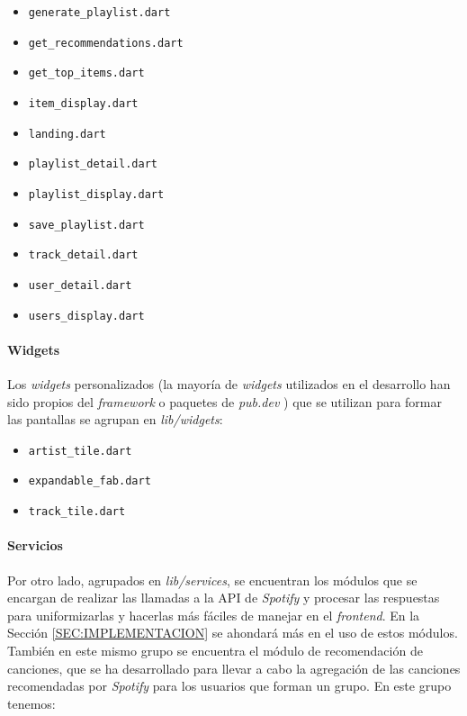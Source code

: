\begin{itemize}
  \item \texttt{generate\_playlist.dart}
  \item \texttt{get\_recommendations.dart}
  \item \texttt{get\_top\_items.dart}
  \item \texttt{item\_display.dart}
  \item \texttt{landing.dart}
  \item \texttt{playlist\_detail.dart}
  \item \texttt{playlist\_display.dart}
  \item \texttt{save\_playlist.dart}
  \item \texttt{track\_detail.dart}
  \item \texttt{user\_detail.dart}
  \item \texttt{users\_display.dart}
\end{itemize}


\paragraph{Widgets}

Los \textit{widgets} personalizados (la mayoría de \textit{widgets} utilizados en el desarrollo han sido propios del \textit{framework} o paquetes de \textit{pub.dev} \cite{pub_dev}) que 
se utilizan para formar las pantallas se agrupan en \textit{lib/widgets}:

\begin{itemize}
  \item \texttt{artist\_tile.dart}
  \item \texttt{expandable\_fab.dart}
  \item \texttt{track\_tile.dart}
\end{itemize}


\paragraph{Servicios}

Por otro lado, agrupados en \textit{lib/services}, se encuentran los módulos que se encargan de realizar las llamadas a la API de \textit{Spotify} y procesar las respuestas para uniformizarlas
y hacerlas más fáciles de manejar en el \textit{frontend}. En la Sección \ref{SEC:IMPLEMENTACION} se ahondará más en el uso de estos módulos. También en este mismo grupo se encuentra el módulo
de recomendación de canciones, que se ha desarrollado para llevar a cabo la agregación de las canciones recomendadas por \textit{Spotify} para los usuarios que forman un grupo. 
En este grupo tenemos:

